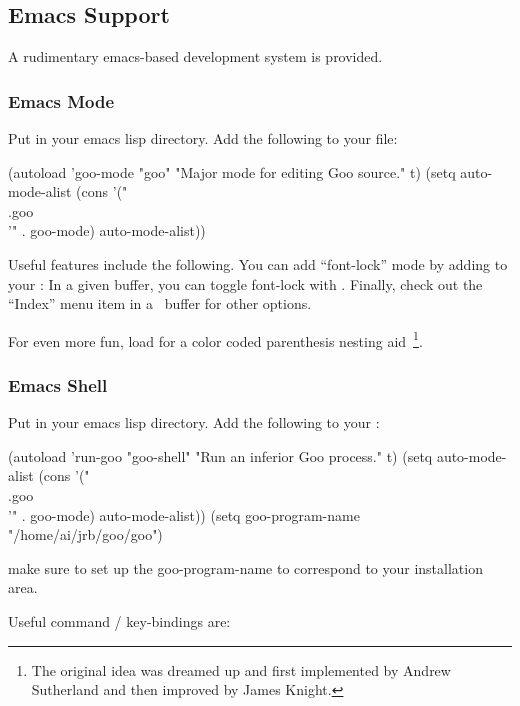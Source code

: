 \documentclass[twoside,twocolumn,9pt]{extarticle}
\begin{document}
\subsection{Emacs Support}

A rudimentary emacs-based development system is provided.

\subsubsection{Emacs Mode}

Put  in your emacs lisp directory.  Add the following to
your  file:

\begin{exv}
(autoload 'goo-mode "goo" "Major mode for editing Goo source." t)
(setq auto-mode-alist
      (cons '("\\.goo\\'" . goo-mode) auto-mode-alist))
\end{exv}

Useful features include the following.
You can add ``font-lock'' mode by adding 
 to your :
In a given buffer, you can toggle font-lock with .
Finally, check out the ``Index'' menu item in a \goo\ buffer for other
options.

For even more fun, load  for a color
coded parenthesis nesting aid~\footnote{The original idea was dreamed
up and first implemented by Andrew Sutherland and then improved by
James Knight.}.

\subsubsection{Emacs Shell}

Put  in your emacs lisp directory.  Add the
following to your :

\begin{exv}
(autoload 'run-goo  "goo-shell" "Run an inferior Goo process." t)
(setq auto-mode-alist
      (cons '("\\.goo\\'" . goo-mode) auto-mode-alist))
(setq goo-program-name "/home/ai/jrb/goo/goo") 
\end{exv}

make sure to set up the goo-program-name to correspond to your
installation area.

Useful command / key-bindings are:
\end{document}
